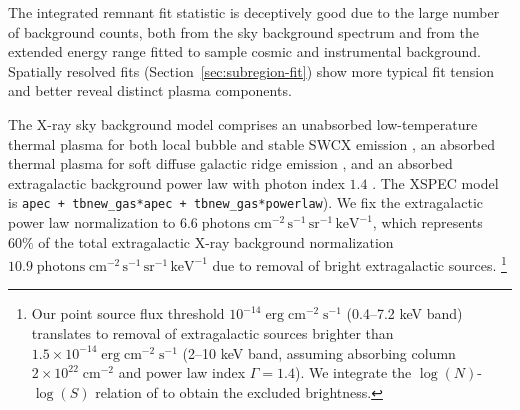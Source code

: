 \documentclass[twocolumn,tighten,trackchanges]{aastex61}
\newcommand*{\mt}{\mathrm}
\newcommand*{\unit}[1]{\;\mt{#1}}  %
\newcommand*{\nHUnits}{\times 10^{22} \unit{cm^{-2}}}
\newcommand*{\kB}{k}  %
\begin{document}
The integrated remnant fit statistic is deceptively good due to the large
number of background counts, both from the sky background spectrum and from the
extended energy range fitted to sample cosmic and instrumental background.
Spatially resolved fits (Section~\ref{sec:subregion-fit}) show more typical fit
tension and better reveal distinct plasma components.

%    

The X-ray sky background model comprises an unabsorbed low-temperature thermal
plasma for both local bubble and stable SWCX emission
\citep{mccammon1990, snowden1990, cravens2000, galeazzi2014, smith2014},
an absorbed thermal plasma for soft diffuse galactic ridge emission
\citep[e.g.][]{kaneda1997}, and an absorbed extragalactic
background power law with photon index $1.4$ \citep{hickox2006}.
The XSPEC model is \texttt{apec + tbnew\_gas*apec + tbnew\_gas*powerlaw}).
We fix the extragalactic power law normalization to
$6.6 \unit{photons\; cm^{-2}\, s^{-1}\, sr^{-1}\, keV^{-1}}$, which
represents $60\%$ of the total extragalactic X-ray background normalization
$10.9 \unit{photons\; cm^{-2}\, s^{-1}\, sr^{-1}\, keV^{-1}}$
\citep{hickox2006} due to removal of bright extragalactic sources.
\footnote{Our point source flux threshold $10^{-14} \unit{erg\;cm^{-2}\;s^{-1}}$
(0.4--7.2 keV band) translates to removal of extragalactic sources brighter than
$1.5 \times 10^{-14} \unit{erg\;cm^{-2}\;s^{-1}}$ (2--10 keV band, assuming
absorbing column $2 \nHUnits$ and power law index $\Gamma = 1.4$).
We integrate the $\log(N)$-$\log(S)$ relation of \citet{moretti2003} to obtain
the excluded brightness.}
\end{document}
